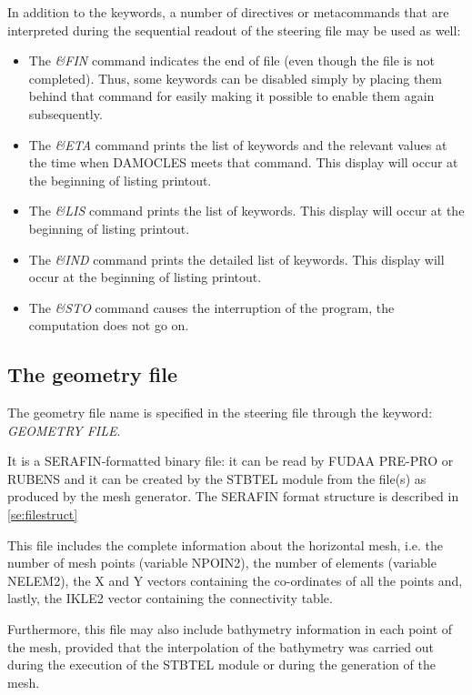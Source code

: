  In addition to the keywords, a number of directives or metacommands that are interpreted during the sequential readout of the steering file may be used as well:

\begin{itemize}
\item  The \textit{\&FIN} command indicates the end of file (even though the file is not completed). Thus, some keywords can be disabled simply by placing them behind that command for easily making it possible to enable them again subsequently.

\item  The \textit{\&ETA} command prints the list of keywords and the relevant values at the time when DAMOCLES meets that command. This display will occur at the beginning of listing printout.

\item  The \textit{\&LIS} command prints the list of keywords. This display will occur at the beginning of listing printout.

\item  The \textit{\&IND} command prints the detailed list of keywords. This display will occur at the beginning of listing printout.

\item  The \textit{\&STO} command causes the interruption of the program, the computation does not go on.
\end{itemize}


\subsection{ The geometry file}

 The geometry file name is specified in the steering file through the keyword: \textit{GEOMETRY FILE}.

 It is a SERAFIN-formatted binary file: it can be read by FUDAA PRE-PRO or RUBENS and it can be created by the STBTEL module from the file(s) as produced by the mesh generator. The SERAFIN format structure is described in \ref{se:filestruct}

 This file includes the complete information about the horizontal mesh, i.e. the number of mesh points (variable NPOIN2), the number of elements (variable NELEM2), the X and Y vectors containing the co-ordinates of all the points and, lastly, the IKLE2 vector containing the connectivity table.

 Furthermore, this file may also include bathymetry information in each point of the mesh, provided that the interpolation of the bathymetry was carried out during the execution of the STBTEL module or during the generation of the mesh.

